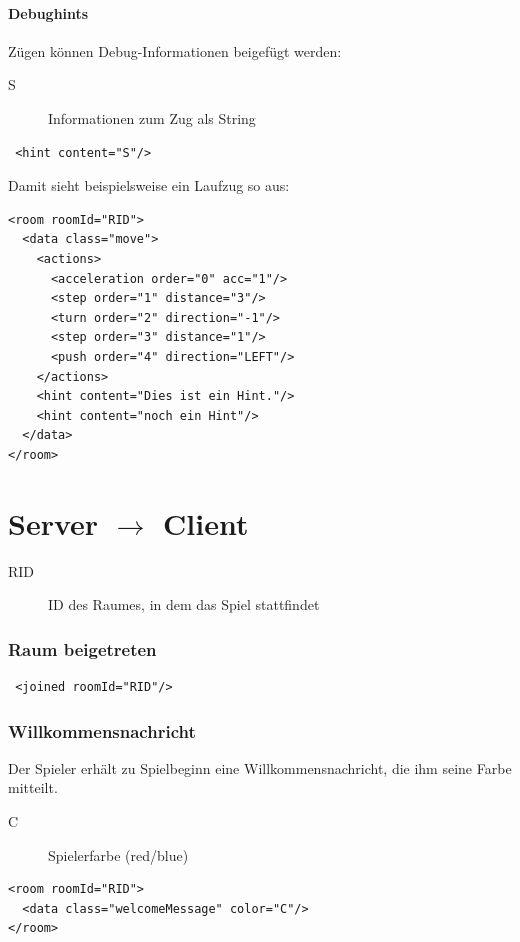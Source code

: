 \documentclass[12pt,a4paper, ngerman, oneside]{scrartcl}
\begin{document}
\subsection{Debughints}
Zügen können Debug-Informationen beigefügt werden:
\begin{description}
\item[S] Informationen zum Zug als String
\end{description}
\begin{verbatim}
 <hint content="S"/>
\end{verbatim}
Damit sieht beispielsweise ein Laufzug so aus:
\begin{verbatim}
<room roomId="RID">
  <data class="move">
    <actions>
      <acceleration order="0" acc="1"/>
      <step order="1" distance="3"/>
      <turn order="2" direction="-1"/>
      <step order="3" distance="1"/>
      <push order="4" direction="LEFT"/>
    </actions>
    <hint content="Dies ist ein Hint."/>
    <hint content="noch ein Hint"/>
  </data>
</room>
\end{verbatim}



\newpage
\part{Server $\rightarrow$ Client}
\begin{description}
\item[RID] ID des Raumes, in dem das Spiel stattfindet
\end{description}

\section{Raum beigetreten}
 \begin{verbatim}
 <joined roomId="RID"/>
 \end{verbatim}

\section{Willkommensnachricht}
Der Spieler erhält zu Spielbeginn eine Willkommensnachricht, die ihm seine Farbe mitteilt.
\begin{description}
\item[C] Spielerfarbe (red/blue)
\end{description}
\begin{verbatim}
<room roomId="RID">
  <data class="welcomeMessage" color="C"/>
</room>
\end{verbatim}
\end{document}
